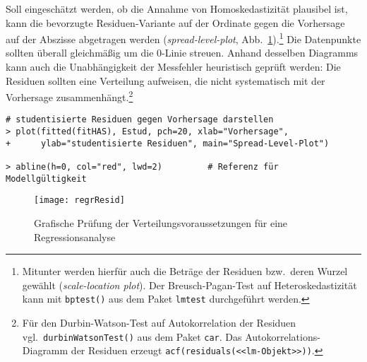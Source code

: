 Soll eingeschätzt werden, ob die Annahme von Homoskedastizität plausibel ist, kann die bevorzugte Residuen-Variante auf der Ordinate gegen die Vorhersage auf der Abszisse abgetragen werden (\emph{spread-level-plot}, Abb.\ \ref{fig:regrResid}).\footnote{Mitunter werden hierfür auch die Beträge der Residuen bzw.\ deren Wurzel gewählt (\emph{scale-location plot}). Der Breusch-Pagan-Test auf Heteroskedastizität kann mit \lstinline!bptest()! aus dem Paket \lstinline!lmtest! \cite{Zeileis2002} durchgeführt werden.} Die Datenpunkte sollten überall gleichmäßig um die $0$-Linie streuen. Anhand desselben Diagramms kann auch die Unabhängigkeit der Messfehler heuristisch geprüft werden: Die Residuen sollten eine Verteilung aufweisen, die nicht systematisch mit der Vorhersage zusammenhängt.\footnote{Für den Durbin-Watson-Test auf Autokorrelation der Residuen vgl.\ \lstinline!durbinWatsonTest()! aus dem Paket \lstinline!car!. Das Autokorrelations-Diagramm der Residuen erzeugt \lstinline!acf(residuals(<<lm-Objekt>>))!.}
\begin{lstlisting}
# studentisierte Residuen gegen Vorhersage darstellen
> plot(fitted(fitHAS), Estud, pch=20, xlab="Vorhersage",
+      ylab="studentisierte Residuen", main="Spread-Level-Plot")

> abline(h=0, col="red", lwd=2)         # Referenz für Modellgültigkeit
\end{lstlisting}

\begin{figure}[ht]
\centering
\texttt{[image: regrResid]}
\vspace*{-0.5em}
\caption{Grafische Prüfung der Verteilungsvoraussetzungen für eine Regressionsanalyse}
\label{fig:regrResid}
\end{figure}

